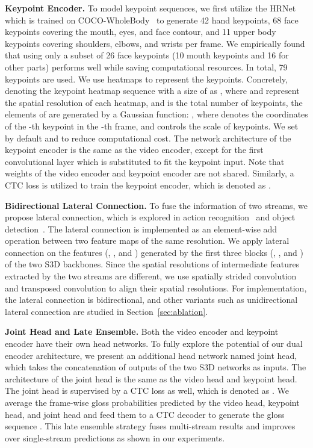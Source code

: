 \documentclass{article}
\begin{document}
\textbf{Keypoint Encoder.} To model keypoint sequences, we first utilize the HRNet~\cite{wang2020deep} which is trained on COCO-WholeBody~\cite{jin2020whole} to generate 42 hand keypoints, 68 face keypoints covering the mouth, eyes, and face contour, and 11 upper body keypoints covering shoulders, elbows, and wrists per frame. We empirically found that using only a subset of 26 face keypoints (10 mouth keypoints and 16 for other parts) performs well while saving computational resources. In total, 79 keypoints are used. We use heatmaps to represent the keypoints. 
Concretely, denoting the keypoint heatmap sequence with a size of  as , where  and  represent the spatial resolution of each heatmap, and  is the total number of keypoints, the elements of  are generated by a Gaussian function: , where  
denotes the coordinates of the -th keypoint in the -th frame, and  controls the scale of keypoints. We set  by default and  to reduce computational cost. The network architecture of the keypoint encoder is the same as the video encoder, except for the first convolutional layer which is substituted to fit the keypoint input. Note that weights of the video encoder and keypoint encoder are not shared. Similarly, a CTC loss is utilized to train the keypoint encoder, which is denoted as .

\textbf{Bidirectional Lateral Connection.}
To fuse the information of two streams, we propose lateral connection, which is explored in action recognition~\cite{feichtenhofer2019slowfast,christoph2016spatiotemporal,feichtenhofer2016convolutional,duan2021revisiting} and object detection~\cite{lin2017feature}. The lateral connection is implemented as an element-wise add operation between two feature maps of the same resolution. We apply lateral connection on the features (, , and ) generated by the first three blocks (, , and ) of the two S3D backbones. Since the spatial resolutions of intermediate features extracted by the two streams are different, we use spatially strided convolution and transposed convolution to align their spatial resolutions. For implementation, the lateral connection is bidirectional, and other variants such as unidirectional lateral connection are studied in Section~\ref{sec:ablation}.


\textbf{Joint Head and Late Ensemble.}
Both the video encoder and keypoint encoder have their own head networks. To fully explore the potential of our dual encoder architecture, we present an additional head network named joint head, which takes the concatenation of outputs of the two S3D networks as inputs. The architecture of the joint head is the same as the video head and keypoint head. The joint head is supervised by a CTC loss as well, which is denoted as . We average the frame-wise gloss probabilities predicted by the video head, keypoint head, and joint head and feed them to a CTC decoder to generate the gloss sequence . This late ensemble strategy fuses multi-stream results and improves over single-stream predictions as shown in our experiments.
\end{document}
